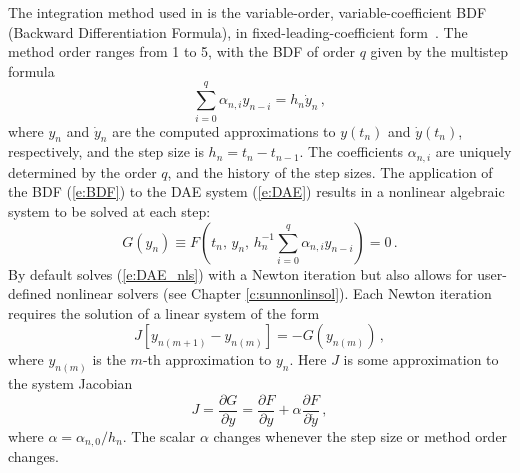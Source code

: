 The integration method used in {\ida} is the variable-order, variable-coefficient
BDF (Backward Differentiation Formula), in fixed-leading-coefficient
form~\cite{BCP:96}.
The method order ranges from 1 to 5, with the BDF of order $q$
given by the multistep formula
\begin{equation}\label{e:BDF}
  \sum_{i=0}^q \alpha_{n,i}y_{n-i} = h_n \dot{y}_n \, ,
\end{equation}
where $y_n$ and $\dot{y}_n$ are the computed approximations to $y(t_n)$
and $\dot{y}(t_n)$, respectively, and the step size is $h_n = t_n - t_{n-1}$.
The coefficients $\alpha_{n,i}$ are uniquely determined by the order
$q$, and the history of the step sizes.  The application of the BDF
(\ref{e:BDF}) to the DAE system (\ref{e:DAE}) results in a nonlinear
algebraic system to be solved at each step:
\begin{equation}\label{e:DAE_nls}
  G(y_n) \equiv
  F \left( t_n , \, y_n , \,
    h_n^{-1} \sum_{i=0}^q \alpha_{n,i}y_{n-i} \right) = 0 \, .
\end{equation}
%
By default {\ida} solves (\ref{e:DAE_nls}) with a Newton iteration but {\ida}
also allows for user-defined nonlinear solvers (see Chapter
\ref{c:sunnonlinsol}). Each Newton iteration requires the solution of a linear
system of the form
\begin{equation}\label{e:DAE_Newtoncorr}
  J [y_{n(m+1)} - y_{n(m)}] = -G(y_{n(m)})  \, ,
\end{equation}
where $y_{n(m)}$ is the $m$-th approximation to $y_n$.
%
Here $J$ is some approximation to the system Jacobian
\begin{equation}\label{e:DAE_Jacobian}
  J = \frac{\partial G}{\partial y}
  = \frac{\partial F}{\partial y} +
  \alpha\frac{\partial F}{\partial \dot{y}} \, ,
\end{equation}
where $\alpha = \alpha_{n,0}/h_n$. The scalar $\alpha$ changes
whenever the step size or method order changes.

